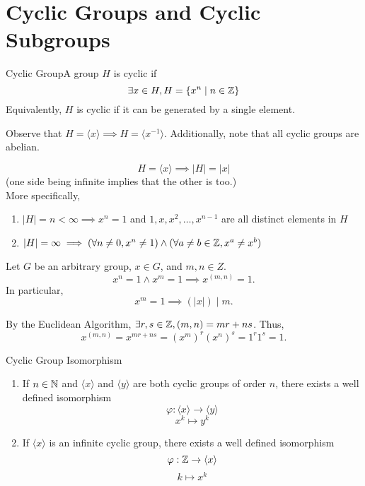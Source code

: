 \documentclass{report}
\newcommand{\thm}[2]{\begin{Theorem}{#1}{}#2\end{Theorem}}
\newcommand{\mprop}[2]{\begin{Prop}{#1}{}#2\end{Prop}}
\newcommand{\dfn}[2]{\begin{Definition}[colbacktitle=red!75!black]{#1}{}#2\end{Definition}}
\newenvironment{myproof}[1][\proofname]{%
	\proof[\bfseries #1: ]%
}{\endproof}
\begin{document}
\section{Cyclic Groups and Cyclic Subgroups}
\dfn{Cyclic Group}{A group $H$ is cyclic if 
$$\exists x \in H, H = \{x^n \mid n \in \mathbb{Z} \}$$
Equivalently, $H$ is cyclic if it can be generated by a single element. }
Observe that $H = \langle x \rangle \implies H = \langle x^{-1} \rangle$. Additionally, note that all cyclic groups are abelian. 
\mprop{}{$$H = \langle x \rangle \implies |H| = |x|$$
(one side being infinite implies that the other is too.)\\
More specifically, 
\begin{enumerate}
    \item $|H| = n < \infty \implies x^n = 1$ and $1, x, x^2, \dots , x^{n-1}$ are all distinct elements in $H$
    \item $|H| = \infty \implies (\forall n \neq 0, x^n \neq 1) \land (\forall a \neq b \in \mathbb{Z}, x^a \neq x^b)$
\end{enumerate}}
\iffalse
\begin{myproof}
    Let $|x| = n$ and consider the $n < \infty$ case. Suppose for $0 \leq a < b < n$, $x^a = x^b$. Then, $x^{b-a} = 1$, yielding a contradiction since $n$ is the smallest positive power of $x$ giving the identity. 
\end{myproof}
\fi
\mprop{}{Let $G$ be an arbitrary group, $x\in G$, and $m, n \in Z$. 
$$x^n = 1 \land x^m = 1 \implies x^{(m,n)} = 1.$$
In particular, 
$$x^m = 1 \implies (|x|) \mid m.$$}
\begin{myproof}
    By the Euclidean Algorithm, $\exists r,s \in \mathbb{Z}, (m, n) = mr + ns$. Thus, 
    $$x^{(m,n)} = x^{mr+ns} = (x^m)^r (x^n)^s = 1^r 1^s = 1.$$
\end{myproof}
\thm{Cyclic Group Isomorphism}{\begin{enumerate}
    \item If $n \in \mathbb{N}$ and $\langle x \rangle$ and $\langle y \rangle$ are both cyclic groups of order $n$, there exists a well defined isomorphism
    $$\varphi : \langle x\rangle \to \langle y \rangle$$
    $$x^k \mapsto y^k$$
    \item If $\langle x \rangle$ is an infinite cyclic group, there exists a well defined isomorphism
    $$\varphi : \mathbb{Z} \to \langle x \rangle$$
    $$k \mapsto x^k$$
\end{enumerate}}
\end{document}
